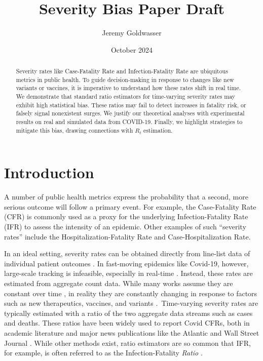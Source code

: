\documentclass{article}
\title{Severity Bias Paper Draft}
\author{Jeremy Goldwasser}
\date{October 2024}
\begin{document}
\maketitle
\begin{abstract}
    Severity rates like Case-Fatality Rate and Infection-Fatality Rate are ubiquitous metrics in public health. To guide decision-making in response to changes like new variants or vaccines, it is imperative to understand how these rates shift in real time. We demonstrate that standard ratio estimators for time-varying severity rates may exhibit high statistical bias. These ratios may fail to detect increases in fatality risk, or falsely signal nonexistent surges. We justify our theoretical analyses with experimental results on real and simulated data from COVID-19. Finally, we highlight strategies to mitigate this bias, drawing connections with $R_t$ estimation.
\end{abstract}
\section{Introduction}

A number of public health metrics express the probability that a second, more serious outcome will follow a primary event. For example, the Case-Fatality Rate (CFR) is commonly used as a proxy for the underlying Infection-Fatality Rate (IFR) to assess the intensity of an epidemic. Other examples of such “severity rates” include the Hospitalization-Fatality Rate and Case-Hospitalization Rate. 

In an ideal setting, severity rates can be obtained directly from line-list data of individual patient outcomes \cite{HFR_line_list1,HFR_linelist2,HFR_linelist3,cfr_line_list}. In fast-moving epidemics like Covid-19, however, large-scale tracking is infeasible, especially in real-time \cite{UKpaper}. Instead, these rates are estimated from aggregate count data. While many works assume they are constant over time \cite{reich2012estimating,ghani,jewell2007nonparametric,lancet_controversial}, in reality they are constantly changing in response to factors such as new therapeutics, vaccines, and variants \cite{nyt}. Time-varying severity rates are typically estimated with a ratio of the two aggregate data streams such as cases and deaths. These ratios have been widely used to report Covid CFRs, both in academic literature \cite{germany,horita2022global,timevar_ifr,yuan2020monitoring,LIU2023100350} and major news publications like the Atlantic \cite{atlantic} and Wall Street Journal \cite{wsj}. While other methods exist, ratio estimators are so common that IFR, for example, is often referred to as the Infection-Fatality \textit{Ratio} \cite{timevar_ifr, lancet_ifr}.
\end{document}
